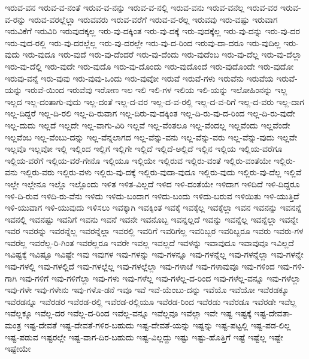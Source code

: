 {ಇರುವ-ವನ
ಇರುವ-ವ-ನಂತೆ
ಇರುವ-ವ-ನನ್ನು
ಇರುವ-ವ-ನಲ್ಲಿ
ಇರುವ-ವನು
ಇರುವ-ವನೆಲ್ಲ
ಇರುವ-ವರ
ಇರುವ-ವ-ರನ್ನು
ಇರುವ-ವರಲ್ಲೆಲ್ಲಾ
ಇರುವವರು
ಇರುವ-ವರೆಗೆ
ಇರುವ-ವ-ರೆಲ್ಲ
ಇರುವವು
ಇರು-ವಷ್ಟು
ಇರುವಾಗ
ಇರುವಿಕೆಗೆ
ಇರುವಿರಿ
ಇರುವುದಕ್ಕಲ್ಲ
ಇರು-ವು-ದಕ್ಕಿಂತ
ಇರು-ವು-ದಕ್ಕೆ
ಇರು-ವುದಕ್ಕೆಲ್ಲ
ಇರು-ವು-ದನ್ನು
ಇರು-ವು-ದರ
ಇರು-ವುದ-ರಲ್ಲಿ
ಇರು-ವು-ದರಲ್ಲೆಲ್ಲ
ಇರು-ವು-ದರಲ್ಲೇ
ಇರು-ವು-ದ-ರಿಂದ
ಇರುವು-ದಾ-ದರೂ
ಇರು-ವುದಿಲ್ಲ
ಇರು-ವುದು
ಇರು-ವುದೂ
ಇರು-ವುದೆ
ಇರು-ವು-ದೆಂದರೆ
ಇರು-ವು-ದೆಂದು
ಇರು-ವುದೆಂಬ
ಇರು-ವು-ದೆಲ್ಲ
ಇರು-ವು-ದೆಲ್ಲಾ
ಇರು-ವು-ದೆಲ್ಲಿ
ಇರು-ವುದೇ
ಇರು-ವುದೊ
ಇರು-ವು-ದೊಂದು
ಇರು-ವುದೊಂದೆ
ಇರು-ವುದೊಂದೇ
ಇರು-ವುದೋ
ಇರುವು-ವನ್ನೆ
ಇರು-ವುವು
ಇರು-ವುವು-ಒಂದು
ಇರು-ವುವೋ
ಇರುವೆ
ಇರುವೆ-ಗಳು
ಇರುವೆನು
ಇರುವೆಯ
ಇರುವೆ-ಯನ್ನು
ಇರುವೆ-ಯಿಂದ
ಇರುವೆವು
ಇರೋಣ
ಇಲ
ಇಲಿ
ಇಲಿ-ಗಳ
ಇಲಿಯ
ಇಲಿ-ಯನ್ನು
ಇಲೋಹಿಂನನ್ನು
ಇಲ್ಲ
ಇಲ್ಲದ
ಇಲ್ಲ-ದಂತಾಗು-ವುದು
ಇಲ್ಲ-ದಂತೆ
ಇಲ್ಲ-ದ-ವರ
ಇಲ್ಲ-ದ-ವ-ರಲ್ಲಿ
ಇಲ್ಲ-ದ-ವ-ರಿಗೆ
ಇಲ್ಲ-ದ-ವರು
ಇಲ್ಲ-ದಾಗ
ಇಲ್ಲ-ದಿದ್ದರೆ
ಇಲ್ಲ-ದಿ-ರಲಿ
ಇಲ್ಲ-ದಿ-ರುವಾಗ
ಇಲ್ಲ-ದಿರು-ವು-ದಕ್ಕಿಂತ
ಇಲ್ಲ-ದಿ-ರು-ವು-ದ-ರಿಂದ
ಇಲ್ಲ-ದಿ-ರು-ವುದೇ
ಇಲ್ಲ-ದುದು
ಇಲ್ಲದೆ
ಇಲ್ಲದೇ
ಇಲ್ಲ-ವಾಗು-ವಿರಿ
ಇಲ್ಲವೆ
ಇಲ್ಲ-ವೆಂತಲೂ
ಇಲ್ಲ-ವೆಂದಲ್ಲ
ಇಲ್ಲವೆಂದು
ಇಲ್ಲವೆಂದೇ
ಇಲ್ಲವೆಂಬ
ಇಲ್ಲ-ವೆಂಬು-ದನ್ನು
ಇಲ್ಲ-ವೆನ್ನಲಾಗದ
ಇಲ್ಲ-ವೆನ್ನು-ವನು
ಇಲ್ಲ-ವೆನ್ನು-ವರು
ಇಲ್ಲ-ವೆನ್ನು-ವುದು
ಇಲ್ಲವೇ
ಇಲ್ಲವೊ
ಇಲ್ಲವೋ
ಇಲ್ಲಿ
ಇಲ್ಲಿಂದ
ಇಲ್ಲಿಗೆ
ಇಲ್ಲಿಗೇ
ಇಲ್ಲಿದೆ
ಇಲ್ಲಿದೆ-ಅಲ್ಲಿದೆ
ಇಲ್ಲಿನ
ಇಲ್ಲಿಯ
ಇಲ್ಲಿಯ-ವರೆಗೂ
ಇಲ್ಲಿಯ-ವರೆಗೆ
ಇಲ್ಲಿಯ-ವರೆ-ಗೇನೊ
ಇಲ್ಲಿಯೂ
ಇಲ್ಲಿಯೇ
ಇಲ್ಲಿರುವ
ಇಲ್ಲಿರು-ವಂತೆ
ಇಲ್ಲಿರು-ವಂತೆಯೇ
ಇಲ್ಲಿರು-ವನು
ಇಲ್ಲಿರು-ವರು
ಇಲ್ಲಿರು-ವಳು
ಇಲ್ಲಿರು-ವು-ದಕ್ಕೆ
ಇಲ್ಲಿರು-ವುದಾ-ವುದೂ
ಇಲ್ಲಿರು-ವುದು
ಇಲ್ಲಿರು-ವು-ದೆಲ್ಲ
ಇಲ್ಲಿವೆ
ಇಲ್ಲೇ
ಇಲ್ಲೇನೂ
ಇಲ್ಲೊ
ಇಲ್ಲೊಂದು
ಇಳಿತ
ಇಳಿತ-ವಿಲ್ಲದೆ
ಇಳಿದ
ಇಳಿ-ದಂತೆಯೇ
ಇಳಿದಾಗ
ಇಳಿದಿದೆ
ಇಳಿ-ದಿದ್ದರೂ
ಇಳಿ-ದಿ-ರುವ
ಇಳಿದಿ-ರು-ವೆನು
ಇಳಿದು
ಇಳಿದು-ಬಂದಾಗ
ಇಳಿದು-ಬಂದು
ಇಳಿದು-ಬರುವ
ಇಳಿಯಿತು
ಇಳಿ-ಯುತ್ತಿದೆ
ಇಳಿ-ಯುವಾಗ
ಇಳಿ-ಯುವುದು
ಇಳಿಸಲು
ಇವಕ್ಕಾಗಿ
ಇವಕ್ಕಿಂತ
ಇವಕ್ಕೆ
ಇವಕ್ಕೆಲ್ಲ
ಇವಕ್ಕೆಲ್ಲಾ
ಇವನ
ಇವನನ್ನು
ಇವನನ್ನೆ
ಇವನಲ್ಲಿ
ಇವನಷ್ಟು
ಇವನಿಗೆ
ಇವನು
ಇವನೆ
ಇವನೇ
ಇವನೊಬ್ಬ
ಇವನ್ನಲ್ಲದೆ
ಇವನ್ನು
ಇವನ್ನೆಲ್ಲ
ಇವನ್ನೆಲ್ಲಾ
ಇವನ್ನೇ
ಇವರ
ಇವರನ್ನು
ಇವರನ್ನೆಲ್ಲ
ಇವರನ್ನೆಲ್ಲಾ
ಇವರಲ್ಲಿ
ಇವರಿಗೆ
ಇವರಿಗೆಲ್ಲ
ಇವರಿಬ್ಬರ
ಇವರಿಬ್ಬರೂ
ಇವರು
ಇವರು-ಗಳ
ಇವರೆಲ್ಲ
ಇವರೆಲ್ಲ-ರಿ-ಗಿಂತ
ಇವರೆಲ್ಲರೂ
ಇವರೇ
ಇವಲ್ಲ
ಇವಲ್ಲದೆ
ಇವಳನ್ನು
ಇವಾವುದೂ
ಇವಾವುವೂ
ಇವಿಲ್ಲದೆ
ಇವಿಷ್ಟಕ್ಕೆ
ಇವಿಷ್ಟೂ
ಇವಿಷ್ಟೇ
ಇವು
ಇವುಗಳ
ಇವು-ಗಳನ್ನು
ಇವು-ಗಳನ್ನೂ
ಇವು-ಗಳನ್ನೆಲ್ಲ
ಇವು-ಗಳನ್ನೆಲ್ಲಾ
ಇವು-ಗಳನ್ನೇ
ಇವು-ಗಳಲ್ಲಿ
ಇವು-ಗಳಲ್ಲಿದೆ
ಇವು-ಗಳಲ್ಲೆಲ್ಲ
ಇವು-ಗಳಲ್ಲೆಲ್ಲಾ
ಇವು-ಗಳಾಚೆ
ಇವು-ಗಳಾವುವೂ
ಇವು-ಗಳಿಂದ
ಇವು-ಗಳಿ-ಗಾಗಿ
ಇವು-ಗಳಿಗೆ
ಇವು-ಗಳಿಗೆಲ್ಲಾ
ಇವು-ಗಳು
ಇವು-ಗಳೆಲ್ಲ
ಇವು-ಗಳೆಲ್ಲ-ದ-ರಿಂದ
ಇವು-ಗಳೆಲ್ಲ-ವನ್ನೂ
ಇವು-ಗಳೆಲ್ಲಾ
ಇವು-ಗಳೇ
ಇವು-ಗಳೇನು
ಇವು-ಗಳೊ-ಡನೆ
ಇವೂ
ಇವೆ
ಇವೆ-ಯೆಂಬು-ದನ್ನು
ಇವೆಯೊ
ಇವೆಯೋ
ಇವೆರಡಕ್ಕೂ
ಇವೆರಡನ್ನೂ
ಇವೆರಡರ
ಇವೆರಡ-ರಲ್ಲಿ
ಇವೆರಡ-ರಲ್ಲಿಯೂ
ಇವೆರಡ-ರಿಂದ
ಇವೆರಡು
ಇವೆರಡೂ
ಇವೆರಡೇ
ಇವೆಲ್ಲ
ಇವೆಲ್ಲಕ್ಕೂ
ಇವೆಲ್ಲ-ದರ
ಇವೆಲ್ಲ-ದ-ರಿಂದ
ಇವೆಲ್ಲ-ವನ್ನೂ
ಇವೆಲ್ಲವೂ
ಇವೆಲ್ಲಾ
ಇವೇ
ಇಷ್ಟ
ಇಷ್ಟಕ್ಕೆ
ಇಷ್ಟ-ದೇವತಾ-ಮಂತ್ರ
ಇಷ್ಟ-ದೇವತೆ
ಇಷ್ಟ-ದೇವತೆ-ಗಳಿರ-ಬಹುದು
ಇಷ್ಟ-ದೇವತೆ-ಯನ್ನು
ಇಷ್ಟನ್ನು
ಇಷ್ಟ-ಪಟ್ಟಲ್ಲಿ
ಇಷ್ಟ-ಪಡ-ಲಿಲ್ಲ
ಇಷ್ಟ-ಪಡುವ
ಇಷ್ಟರಲ್ಲೇ
ಇಷ್ಟ-ವಾಗ-ದಿರ-ಬಹುದು
ಇಷ್ಟ-ವಿಲ್ಲದ್ದು
ಇಷ್ಟು
ಇಷ್ಟು-ಹೊತ್ತಿಗೆ
ಇಷ್ಟೆ
ಇಷ್ಟೆಲ್ಲ
ಇಷ್ಟೇ
ಇಷ್ಟೇಯೇ
}
